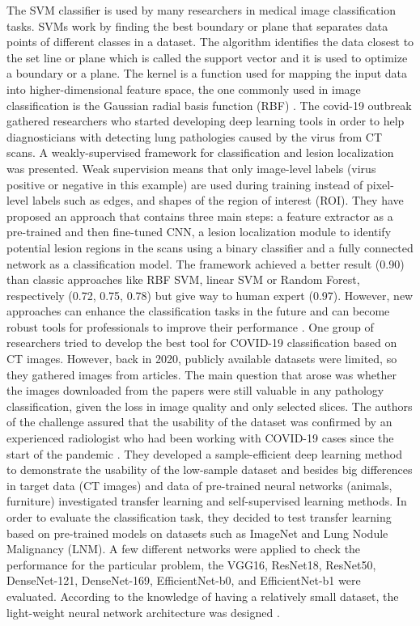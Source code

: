 \documentclass[runningheads]{llncs}
\begin{document}
\indent
The SVM classifier is used by many researchers in medical image classification tasks. SVMs work by finding the best boundary or plane that separates data points of different classes in a dataset. The algorithm identifies the data closest to the set line or plane which is called the support vector and it is used to optimize a boundary or a plane. The kernel is a function used for mapping the input data into higher-dimensional feature space, the one commonly used in image classification is the Gaussian radial basis function (RBF) \cite{SVM1,SVM2}.
\newline
\indent
The covid-19 outbreak gathered researchers who started developing deep learning tools in order to help diagnosticians with detecting lung pathologies caused by the virus from CT scans. A weakly-supervised framework for classification and lesion localization was presented. Weak supervision means that only image-level labels (virus positive or negative in this example) are used during training instead of pixel-level labels such as edges, and shapes of the region of interest (ROI). They have proposed an approach that contains three main steps: a feature extractor as a pre-trained and then fine-tuned CNN, a lesion localization module to identify potential lesion regions in the scans using a binary classifier and a fully connected network as a classification model.
The framework achieved a better result (0.90) than classic approaches like RBF SVM, linear SVM or Random Forest, respectively (0.72, 0.75, 0.78) but give way to human expert (0.97). However, new approaches can enhance the classification tasks in the future and can become robust tools for professionals to improve their performance \cite{WeaklyFramework}.
\newline
\indent
One group of researchers tried to develop the best tool for COVID-19 classification based on CT images. However, back in 2020, publicly available datasets were limited, so they gathered images from articles. The main question that arose was whether the images downloaded from the papers were still valuable in any pathology classification, given the loss in image quality and only selected slices. The authors of the challenge assured that the usability of the dataset was confirmed by an experienced radiologist who had been working with COVID-19 cases since the start of the pandemic \cite{zhao2020COVID-CT-Dataset}. They developed a sample-efficient deep learning method to demonstrate the usability of the low-sample dataset and besides big differences in target data (CT images) and data of pre-trained neural networks (animals, furniture) investigated transfer learning and self-supervised learning methods. In order to evaluate the classification task, they decided to test transfer learning based on pre-trained models on datasets such as ImageNet \cite{ImageNet} and Lung Nodule Malignancy (LNM). A few different networks were applied to check the performance for the particular problem, the VGG16, ResNet18, ResNet50, DenseNet-121, DenseNet-169, EfficientNet-b0, and EfficientNet-b1 were evaluated. According to the knowledge of having a relatively small dataset, the light-weight neural network architecture was designed \cite{he2020sample}. 
\end{document}
